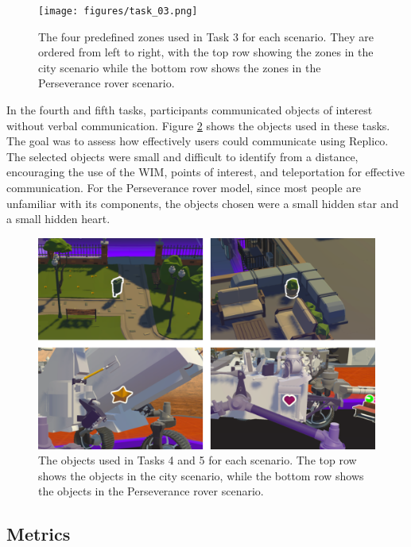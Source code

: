         \begin{figure}[h]
            \centering
            \texttt{[image: figures/task\_03.png]}
            \caption{The four predefined zones used in Task 3 for each scenario. They are ordered from left to right, with the top row showing the zones in the city scenario while the bottom row shows the zones in the Perseverance rover scenario.}
            \label{fig:task_03}
        \end{figure}

        In the fourth and fifth tasks, participants communicated objects of interest without verbal communication. Figure \ref{fig:task_04} shows the objects used in these tasks. The goal was to assess how effectively users could communicate using Replico. The selected objects were small and difficult to identify from a distance, encouraging the use of the WIM, points of interest, and teleportation for effective communication. For the Perseverance rover model, since most people are unfamiliar with its components, the objects chosen were a small hidden star and a small hidden heart.

        \begin{figure}[h]
            \centering
            \includegraphics[width=1\linewidth]{figures/task_04.png}
            \caption{The objects used in Tasks 4 and 5 for each scenario. The top row shows the objects in the city scenario, while the bottom row shows the objects in the Perseverance rover scenario.}
            \label{fig:task_04}
        \end{figure}


    \subsection{Metrics} \label{sec:evaluation_metrics}


